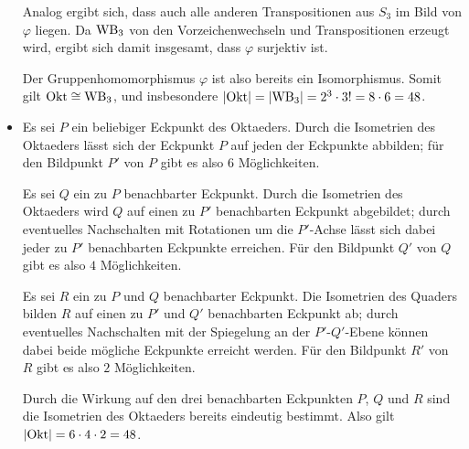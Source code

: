 \begin{itemize}
\begin{center}
    \end{center}
    Analog ergibt sich, dass auch alle anderen Transpositionen aus $S_3$ im Bild von $\varphi$ liegen.
    Da $\mathrm{WB}_{3}$ von den Vorzeichenwechseln und Transpositionen erzeugt wird, ergibt sich damit insgesamt, dass $\varphi$ surjektiv ist.
    
    Der Gruppenhomomorphismus $\varphi$ ist also bereits ein Isomorphismus.
    Somit gilt $\mathrm{Okt} \cong\mathrm{WB}_{3}$, und insbesondere $|\mathrm{Okt}| = |\mathrm{WB}_{3}| = 2^3 \cdot 3! = 8 \cdot 6 = 48$.
    
  \item
    Es sei $P$ ein beliebiger Eckpunkt des Oktaeders.
    Durch die Isometrien des Oktaeders lässt sich der Eckpunkt $P$ auf jeden der Eckpunkte abbilden;
    für den Bildpunkt $P'$ von $P$ gibt es also $6$ Möglichkeiten.
    
    Es sei $Q$ ein zu $P$ benachbarter Eckpunkt.
    Durch die Isometrien des Oktaeders wird $Q$ auf einen zu $P'$ benachbarten Eckpunkt abgebildet;
    durch eventuelles Nachschalten mit Rotationen um die $P'$-Achse lässt sich dabei jeder zu $P'$ benachbarten Eckpunkte erreichen.
    Für den Bildpunkt $Q'$ von $Q$ gibt es also $4$ Möglichkeiten.
    
    Es sei $R$ ein zu $P$ und $Q$ benachbarter Eckpunkt.
    Die Isometrien des Quaders bilden $R$ auf einen zu $P'$ und $Q'$ benachbarten Eckpunkt ab;
    durch eventuelles Nachschalten mit der Spiegelung an der $P'$-$Q'$-Ebene können dabei beide mögliche Eckpunkte erreicht werden.
    Für den Bildpunkt $R'$ von $R$ gibt es also $2$ Möglichkeiten.
    
    Durch die Wirkung auf den drei benachbarten Eckpunkten $P$, $Q$ und $R$ sind die Isometrien des Oktaeders bereits eindeutig bestimmt.
    Also gilt $|\mathrm{Okt}| = 6 \cdot 4 \cdot 2 = 48$.
\end{itemize}

